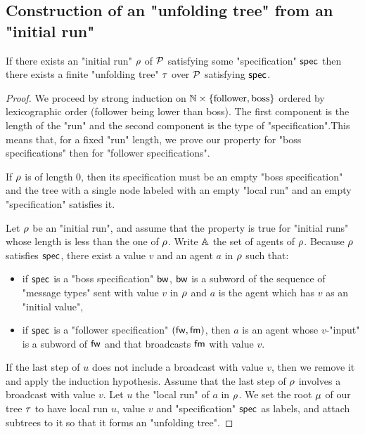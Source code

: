\subsection{Construction of an "unfolding tree" from an "initial run"}
\label{app:run-to-tree}


\begin{lemma}
	\label{lem:run-to-tree}
	If there exists an "initial run" $\rho$ of $\mathcal{P}$ satisfying some "specification" $\mathsf{spec}$ then there exists a finite "unfolding tree" $\tau$ over $\mathcal{P}$ satisfying $\mathsf{spec}$.
\end{lemma}

\begin{proof}
	
	We proceed by strong induction on $\mathbb{N} \times \{\text{follower}, \text{boss}\}$ ordered by lexicographic order (follower being lower than boss). The first component is the length of the "run" and the second component is the type of "specification".This means that, for a fixed "run" length, we prove our property for "boss specifications" then for "follower specifications". 
	
	If $\rho$ is of length $0$, then its specification must be an empty "boss specification" and the tree with a single node labeled with an empty "local run" and an empty "specification" satisfies it.

	Let $\rho$ be an "initial run", and assume that the property is true for "initial runs" whose length is less than the one of $\rho$. Write $\mathbb{A}$ the set of agents of $\rho$.
	Because $\rho$ satisfies $\mathsf{spec}$, there exist a value $v$ and an agent $a$ in $\rho$ such that:
	\begin{itemize}
	\item if $\mathsf{spec}$ is a "boss specification" $\mathsf{bw}$, $\mathsf{bw}$ is a subword of the sequence of "message types" sent with value $v$ in $\rho$ and $a$ is the agent which has $v$ as an "initial value",
	\item if $\mathsf{spec}$ is a "follower specification" $(\mathsf{fw}, \mathsf{fm})$, then $a$ is an agent whose $v$-"input" is a subword of $\mathsf{fw}$ and that broadcasts $\mathsf{fm}$ with value $v$. 
	\end{itemize}

	If the last step of $u$ does not include a broadcast with value $v$, then we remove it and apply the induction hypothesis. Assume that the last step of $\rho$ involves a broadcast with value $v$. 
	Let $u$ the "local run" of $a$ in $\rho$. We set the root $\mu$ of our tree $\tau$ to have local run $u$, value $v$ and "specification" $\mathsf{spec}$ as labels, and attach subtrees to it so that it forms an "unfolding tree".


\end{proof}
